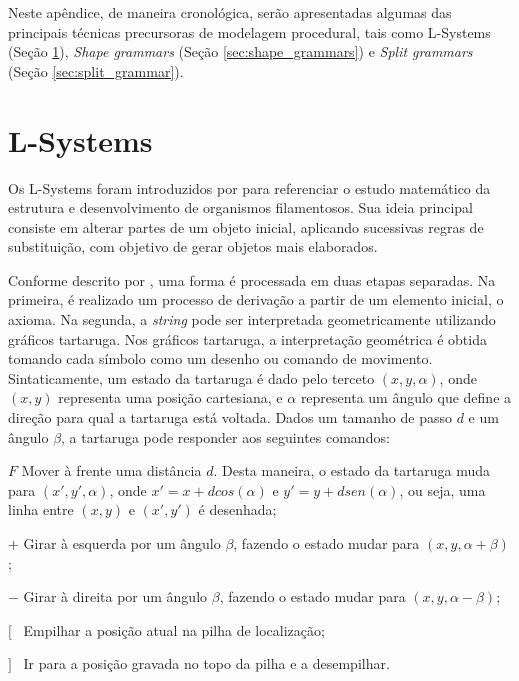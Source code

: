 \label{ap:abordagens_precursoras}

Neste apêndice, de maneira cronológica, serão apresentadas algumas das principais técnicas precursoras de modelagem procedural, tais como \gls{L-Systems} (Seção \ref{sec:l_systems}), \textit{Shape grammars} (Seção \ref{sec:shape_grammars}) e \textit{Split grammars} (Seção \ref{sec:split_grammar}).

\section{L-Systems}
\label{sec:l_systems}

Os \gls{L-Systems} foram introduzidos por  para referenciar o estudo matemático da estrutura e desenvolvimento de organismos filamentosos. Sua ideia principal consiste em alterar partes de um objeto inicial, aplicando sucessivas regras de substituição, com objetivo de gerar objetos mais elaborados.

Conforme descrito por , uma forma é processada em duas etapas separadas. Na primeira, é realizado um processo de derivação a partir de um elemento inicial, o axioma. Na segunda, a \textit{string} pode ser interpretada geometricamente utilizando gráficos tartaruga. Nos gráficos tartaruga, a interpretação geométrica é obtida tomando cada símbolo como um desenho ou comando de movimento. Sintaticamente, um estado da tartaruga é dado pelo terceto $(x, y, \alpha)$, onde $(x, y)$ representa uma posição cartesiana, e $\alpha$ representa um ângulo que define a direção para qual a tartaruga está voltada. Dados um tamanho de passo $d$ e um ângulo $\beta$, a tartaruga pode responder aos seguintes comandos:

\vspace{0.5cm}

\begin{description}
    \item $F$ \quad Mover à frente uma distância $d$. Desta maneira, o estado da tartaruga muda para $(x', y', \alpha)$, onde $x' = x + d cos(\alpha)$ e $y' = y + d sen(\alpha)$, ou seja, uma linha entre $(x, y)$ e $(x', y')$ é desenhada;
    
    \item $+$ \quad Girar à esquerda por um ângulo $\beta$, fazendo o estado mudar para $(x, y, \alpha + \beta)$;
    
    \item $-$ \quad Girar à direita por um ângulo $\beta$, fazendo o estado mudar para $(x, y, \alpha - \beta)$;
    
    \item $[$ \quad \, Empilhar a posição atual na pilha de localização;
    
    \item $]$ \quad \, Ir para a posição gravada no topo da pilha e a desempilhar.
\end{description}

